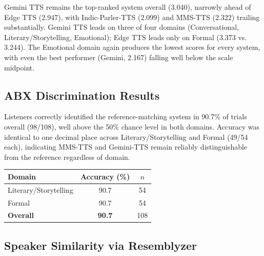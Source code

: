 \documentclass[a4paper,fleqn]{cas-dc}
\begin{document}
    
    
    Gemini TTS remains the top-ranked system overall (3.040), narrowly ahead of
    Edge TTS (2.947), with Indic-Parler-TTS (2.099) and MMS-TTS (2.322) trailing
    substantially. Gemini TTS leads on three of four domains (Conversational,
    Literary/Storytelling, Emotional); Edge TTS leads only on Formal (3.373 vs.
    3.244). The Emotional domain again produces the lowest scores for every
    system, with even the best performer (Gemini, 2.167) falling well below the
    scale midpoint.
    
    \subsection{ABX Discrimination Results}\label{sec:results-abx}
    
    
    Listeners correctly identified the reference-matching system in 90.7\% of
    trials overall (98/108), well above the 50\% chance level in both domains.
    Accuracy was identical to one decimal place across Literary/Storytelling and
    Formal (49/54 each), indicating MMS-TTS and Gemini-TTS remain reliably
    distinguishable from the reference regardless of domain.
    
    \label{tbl:abx}
    
    \small
    \renewcommand{\arraystretch}{1.15}
    
    \begin{tabular*}{\columnwidth}{@{\extracolsep{\fill}}lcc@{}}
    \toprule
    \textbf{Domain} & \textbf{Accuracy (\%)} & \textbf{$n$} \\
    \midrule
    Literary/Storytelling & 90.7 & 54 \\
    Formal                & 90.7 & 54 \\
    \midrule
    \textbf{Overall}      & \textbf{90.7} & 108 \\
    \bottomrule
    \end{tabular*}
    
    
    \subsection{Speaker Similarity via Resemblyzer}\label{sec:results-speaker}
\end{document}
